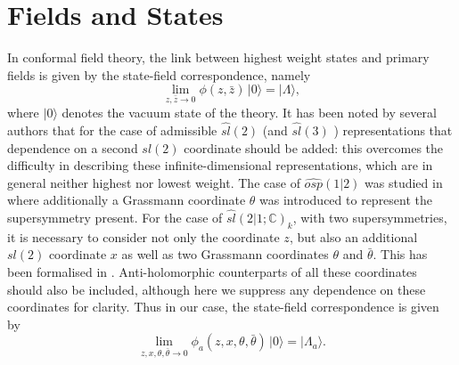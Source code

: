 \documentclass[a4paper,12pt]{article}
\def\thetabar    {\bar{\theta}}
\def\hslck       {\hat{sl}(2|1;{\mathbb C})_k}
\begin{document}
\section{Fields and States}

In conformal field theory, the link between highest weight states and
primary fields is given by the state-field correspondence, namely
\begin{equation}
\lim_{z, \bar{z} \rightarrow 0} \phi(z,
\bar{z})\,|0 \rangle = |\Lambda \rangle,
\end{equation}
where $|0 \rangle$ denotes the vacuum state of the theory.  It
has been noted by several authors \cite{AY, BF, FGP, FM, DLM, PRY,
And}  that for the case of 
admissible $\hat{sl}(2)$ (and $\hat{sl}(3)$ \cite{FGP1, FGP2, GPW})
representations that dependence on a second $sl(2)$ coordinate should
be added: this overcomes the difficulty in describing these
infinite-dimensional representations, which are in general neither
highest nor lowest weight.  The case of $\widehat{osp}(1|2)$ was
studied in \cite{ER} where additionally a Grassmann coordinate
$\theta$ was introduced to represent the supersymmetry present.  For
the case of $\hslck$, with two supersymmetries, it is necessary to
consider not only the coordinate $z$, but also an additional $sl(2)$
coordinate $x$ as well as two Grassmann coordinates $\theta$ and
$\thetabar$.  This has been formalised in \cite{Ras}.  Anti-holomorphic 
counterparts of all these coordinates
should also be included, although here we suppress any dependence on
these coordinates for clarity.  Thus in our case, the state-field
correspondence is given by
\begin{equation}
\label{stfi}
\lim_{z,x,\theta,\thetabar \rightarrow
0} \phi_a (z,x,\theta,\thetabar)\,|0 \rangle =
|\Lambda_a \rangle.
\end{equation}
\end{document}
